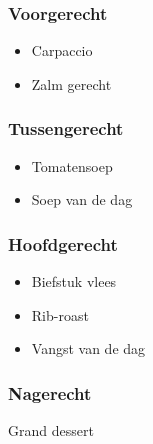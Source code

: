 \subsubsection*{Voorgerecht}
\begin{itemize}
	\item Carpaccio
	\item Zalm gerecht
\end{itemize}

\subsubsection*{Tussengerecht}
\begin{itemize}
	\item Tomatensoep
	\item Soep van de dag
\end{itemize}

\subsubsection*{Hoofdgerecht}
\begin{itemize}
	\item Biefstuk vlees
	\item Rib-roast
	\item Vangst van de dag
\end{itemize}

\subsubsection*{Nagerecht}
Grand dessert
